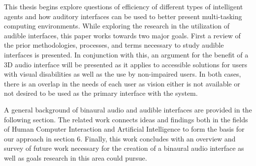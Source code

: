 This thesis begins explore questions of efficiency of different types of intelligent
agents and how auditory interfaces can be used to better present multi-tasking
computing environments. While exploring the research in the utilization of audible
interfaces, this paper works towards two major goals. First a review of the prior
methodologies, processes, and terms necessary to study audible interfaces is
presented. In conjunction with this, an argument for the benefit of a 3D audio
interface will be presented as it applies to accessible solutions for users with
visual disabilities as well as the use by non-impaired users. In both cases, there
is an overlap in the needs of each user as vision either is not available or not
desired to be used as the primary interface with the system.


A general background of binaural audio and audible interfaces are provided in
the following section. The related work connects ideas and findings both in the
fields of Human Computer Interaction and Artificial Intelligence to form the
basis for our approach in section 6. Finally, this work concludes with an
overview and survey of future work necessary for the creation of a binaural
audio interface as well as goals research in this area could pursue.
